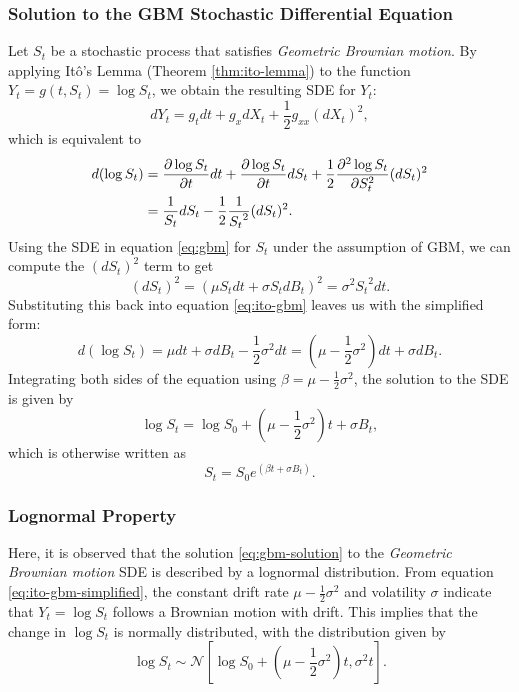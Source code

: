 \subsubsection{Solution to the GBM Stochastic Differential Equation}
Let $S_t$ be a stochastic process that satisfies \textit{Geometric Brownian motion}. By applying It\^{o}'s Lemma (Theorem \ref{thm:ito-lemma}) to the function $ Y_t = g(t, S_t) = \log S_t$, we obtain the resulting SDE for $Y_t$:
\begin{equation}
    dY_t = g_t dt + g_x dX_t + \frac{1}{2} g_{xx} (dX_t)^2,
\end{equation}
which is equivalent to
\begin{align}
    d(\log S_t) 
    {}={}& \frac{\partial \log S_t}{\partial t} dt + \frac{\partial \log S_t}{\partial t} dS_t + \frac{1}{2} \frac{\partial^2 \log S_t}{\partial S_t^2} (dS_t)^2 \notag\\
    {}={}& \frac{1}{S_t} dS_t - \frac{1}{2} \frac{1}{{S_t}^2} (dS_t)^2. \label{eq:ito-gbm}
\end{align}
Using the SDE in equation \eqref{eq:gbm} for $S_t$ under the assumption of GBM, we can compute the $(dS_t)^2$ term to get
\begin{equation}
    (dS_t)^2 = (\mu S_t dt + \sigma S_t dB_t)^2 = \sigma ^2 {S_t}^2 dt.
\end{equation}
Substituting this back into equation \eqref{eq:ito-gbm} leaves us with the simplified form:
\begin{equation}
    d(\log S_t) = \mu dt + \sigma dB_t - \frac{1}{2} \sigma^2 dt = (\mu - \frac{1}{2} \sigma^2) dt + \sigma dB_t. \label{eq:ito-gbm-simplified}
\end{equation}
Integrating both sides of the equation using $\beta = \mu - \frac{1}{2} \sigma^2$, the solution to the SDE is given by
\begin{equation}
    \log S_t = \log S_0 + (\mu - \frac{1}{2} \sigma^2) t + \sigma B_t, \label{eq:log-gbm}
\end{equation}
which is otherwise written as
\begin{equation}
    S_t = S_0 e^{(\beta t + \sigma B_t)}. \label{eq:gbm-solution}
\end{equation}

\subsubsection{Lognormal Property}
Here, it is observed that the solution \eqref{eq:gbm-solution} to the \textit{Geometric Brownian motion} SDE is described by a lognormal distribution. From equation \eqref{eq:ito-gbm-simplified}, 
the constant drift rate $\mu - \frac{1}{2} \sigma^2$ and volatility $\sigma$ indicate that $Y_t = \log S_t$ follows a Brownian motion with drift. This implies that the change in $\log S_t$ is normally distributed, with the distribution given by
\begin{equation}
    \log S_t \sim \mathcal{N}[ \log S_0 + (\mu - \frac{1}{2} \sigma^2)t, \sigma^2 t].
\end{equation}

